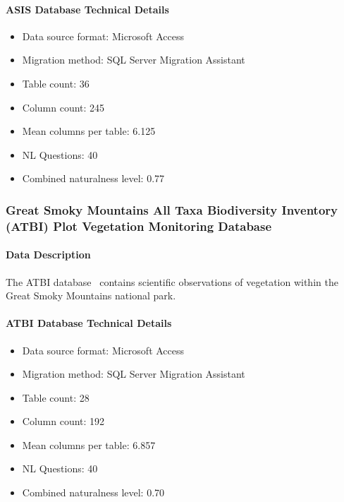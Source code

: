 
\paragraph{ASIS Database Technical Details}
\begin{itemize}
  \item Data source format: Microsoft Access
  \item Migration method: SQL Server Migration Assistant
  \item Table count: 36
  \item Column count: 245
  \item Mean columns per table: 6.125
  \item NL Questions: 40
  \item Combined naturalness level: 0.77 
\end{itemize}

\subsubsection{Great Smoky Mountains All Taxa Biodiversity Inventory (ATBI) Plot Vegetation Monitoring Database}

\paragraph{Data Description}
The ATBI database~\cite{gsmnp-atbi} contains scientific observations of vegetation within the Great Smoky Mountains national park.


\paragraph{ATBI Database Technical Details}
\begin{itemize}
  \item Data source format: Microsoft Access
  \item Migration method: SQL Server Migration Assistant
  \item Table count: 28
  \item Column count: 192
  \item Mean columns per table: 6.857
  \item NL Questions: 40
  \item Combined naturalness level: 0.70 
\end{itemize}

